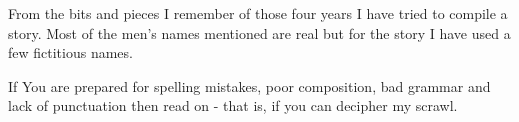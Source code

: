 From the bits and pieces I remember of those four years I have tried
to compile a story. Most of the men's names mentioned are real but
for the story I have used a few fictitious names.

If You are prepared for spelling mistakes, poor composition, bad
grammar and lack of punctuation then read on - that is, if you can
decipher my scrawl.
